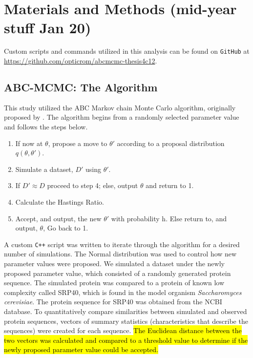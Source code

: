 \documentclass{article}
\newcommand{\sclong}{\textit{Saccharomyces cerevisiae}\xspace}
\begin{document}

\section{Materials and Methods (mid-year stuff Jan 20)} 
\label{methods}
Custom scripts and commands utilized in this analysis can be found on \texttt{GitHub} at
\url{https://github.com/opticrom/abcmcmc-thesis4c12}.


\subsection{ABC-MCMC: The Algorithm}

This study utilized the ABC Markov chain Monte Carlo algorithm, originally proposed by \citet{marjoram2003markov}. The algorithm begins from a randomly selected parameter value and follows the steps below.

	\begin{enumerate}
		\item If now at $\theta$, propose a move to $\theta'$ according to a proposal distribution $q(\theta, \theta')$.
		\item Simulate a dataset, $D'$ using $\theta'$.
		\item If $D' \approx D$ proceed to step 4; else, output $\theta$ and return to 1.
		\item Calculate the Hastings Ratio.
		\item Accept, and output, the new $\theta'$ with probability h. Else return to, and output, $\theta$, Go back to 1.
	\end{enumerate}

A custom \texttt{C++} script was written to iterate through the algorithm for a desired number of simulations. The Normal distribution was used to control how new parameter values were proposed. We simulated a dataset under the newly proposed parameter value, which consisted of a randomly generated protein sequence. The simulated protein was compared to a protein of known low complexity called SRP40, which is found in the model organism \sclong. The protein sequence for SRP40 was obtained from the NCBI database. To quantitatively compare similarities between simulated and observed protein sequences, vectors of summary statistics (characteristics that describe the sequences) were created for each sequence. \hl{The Euclidean distance between the two vectors was calculated and compared to a threshold value to determine if the newly proposed parameter value could be accepted.}
\end{document}
